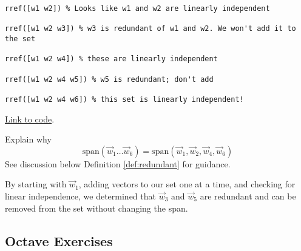 \documentclass{ximera}
\begin{document}
\begin{example}
\begin{explanation}
\begin{verbatim}
rref([w1 w2]) % Looks like w1 and w2 are linearly independent

rref([w1 w2 w3]) % w3 is redundant of w1 and w2. We won't add it to the set

rref([w1 w2 w4]) % these are linearly independent

rref([w1 w2 w4 w5]) % w5 is redundant; don't add

rref([w1 w2 w4 w6]) % this set is linearly independent!
        \end{verbatim}

        \href{https://sagecell.sagemath.org/?z=eJyNjz1rwzAURXeD_8NdQprBIfJXUoSnduzewXgw1jMxNnKQlYhQ-t_7pFDa0BYKRsPRvUfXKzxTP2iCPRIu1NnZLBi0Gi6DOrfTdI2jOHKiqkUqIXYSScpH0UimaVVnDEQukQq-FYFmVZ2UjLODROlL-4DzquZc4rNcEo8BFrcsf_leItsFWFa1r3kjw4NncbTC00Stma54c-Idw4KJVwfAa-lEfGjrcy9k1wtapeBS2Dn82EIWrVbojtSNW-8zhvqH2gkONRtwa55H7xwJDH2W262hP565E8BlweEyv8uQOmvVaou5_3Jt8crmWa9tmDbYb9N-6PKg49uF_r8hhytuM4q7GRLq89nfOmWz-QDgyJSO&lang=octave&interacts=eJyLjgUAARUAuQ==}{Link to code}.

        \begin{question}
        Explain why $$\text{span}(\vec{w}_1\dots\vec{w}_6)=\text{span}(\vec{w}_1, \vec{w}_2, \vec{w}_4, \vec{w}_6)$$
        See discussion below Definition \ref{def:redundant} for guidance.
        \end{question}

        By starting with $\vec{w}_1$, adding vectors to our set one at a time, and checking for linear independence, we determined that $\vec{w}_3$ and $\vec{w}_5$ are redundant and can be removed from the set without changing the span.

    \end{explanation}
\end{example}

\subsection*{Octave Exercises}
\end{document}
